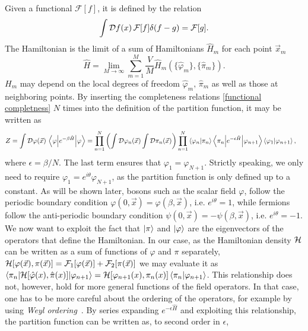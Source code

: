 Given a functional $\mathcal{F}[f]$, it is defined by the relation
\begin{equation}
    \int \mathcal{D} f(x)\, \mathcal{F}[f] \delta(f - g) = \mathcal{F}[g].
\end{equation}
The Hamiltonian is the limit of a sum of Hamiltonians $\hat H_m$ for each point $\vec x_m$
\begin{equation*}
    \hat H
    = \lim_{M \rightarrow \infty} \sum_{m=1}^M 
    \frac{V}{M} \hat H_m(\{\hat \varphi_m\}, \{\hat \pi_m\}).
\end{equation*}
$H_m$ may depend on the local degrees of freedom $\hat \varphi_m, \, \hat \pi_m$ as well as those at neighboring points.
By inserting the completeness relations \autoref{functional completness} $N$ times into the definition of the partition function, it may be written as
\begin{align*}
    Z& 
    = \int \mathcal{D}\varphi(\vec x) \, \left\langle \varphi {\left| e^{- \beta \hat H} \right|} \varphi \right\rangle
    = 
    \prod_{n=1}^N
    \left(
        \int \mathcal{D} \varphi_n (\vec x) \int \mathcal{D} \pi_n(\vec x)
    \right) 
    \prod_{n=1}^N  \braket{\varphi_n}{\pi_n}
    \left\langle \pi_n {\left| e^{- \epsilon \hat H} \right|} \varphi_{n+1} \right\rangle \braket{\varphi_{1}}{\varphi_{n+1}},
\end{align*}
where $\epsilon = \beta / N$. The last term ensures that $\varphi_1 = \varphi_{N+1}$.
Strictly speaking, we only need to require $\varphi_1 = e^{i\theta}\varphi_{N+1}$, as the partition function is only defined up to a constant.
As will be shown later, bosons such as the scalar field $\varphi$, follow the periodic boundary condition $\varphi(0, \vec x) = \varphi(\beta, \vec x)$, i.e. $e^{i\theta} = 1$, while fermions follow the anti-periodic boundary condition $\psi(0, \vec x) = -\psi(\beta, \vec x)$, i.e. $e^{i\theta} = -1$.
We now want to exploit the fact that $\ket{\pi}$ and $\ket{\varphi}$ are the eigenvectors of the operators that define the Hamiltonian.
In our case, as the Hamiltonian density $\mathcal{H}$ can be written as a sum of functions of $\varphi$ and $\pi$ separately, $\mathcal{H}[\varphi(\vec x), \pi(\vec x)] = \mathcal{F}_1[\varphi(\vec x)] + \mathcal{F}_2[\pi(\vec x)]$ we may evaluate it as $\left\langle \pi_n {\left| \mathcal{H}[\hat \varphi(x), \hat \pi(x)] \right|} \varphi_{n+1} \right\rangle = \mathcal{H}[\varphi_{n+1}(x), \pi_n(x)] \braket{\pi_n}{\varphi_{n+1}}$.
This relationship does not, however, hold for more general functions of the field operators.
In that case, one has to be more careful about the ordering of the operators, for example by using \emph{Weyl ordering}~\cite{Peskin:IntroQFT}.
By series expanding $e^{-\epsilon \hat H}$ and exploiting this relationship, the partition function can be written as, to second order in $\epsilon$,
